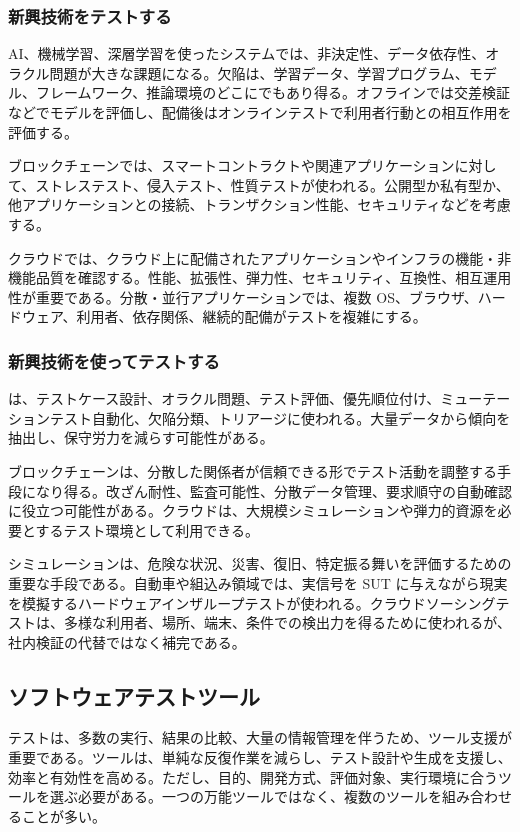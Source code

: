 \documentclass[a4paper,11pt]{ltjsarticle}
\numberwithin{figure}{section}
\numberwithin{table}{section}
\begin{document}
\subsubsection{新興技術をテストする}
AI、機械学習、深層学習を使ったシステムでは、非決定性、データ依存性、オラクル問題が大きな課題になる。欠陥は、学習データ、学習プログラム、モデル、フレームワーク、推論環境のどこにでもあり得る。オフラインでは交差検証などでモデルを評価し、配備後はオンラインテストで利用者行動との相互作用を評価する。

ブロックチェーンでは、スマートコントラクトや関連アプリケーションに対して、ストレステスト、侵入テスト、性質テストが使われる。公開型か私有型か、他アプリケーションとの接続、トランザクション性能、セキュリティなどを考慮する。

クラウドでは、クラウド上に配備されたアプリケーションやインフラの機能・非機能品質を確認する。性能、拡張性、弾力性、セキュリティ、互換性、相互運用性が重要である。分散・並行アプリケーションでは、複数 OS、ブラウザ、ハードウェア、利用者、依存関係、継続的配備がテストを複雑にする。

\subsubsection{新興技術を使ってテストする}
は、テストケース設計、オラクル問題、テスト評価、優先順位付け、ミューテーションテスト自動化、欠陥分類、トリアージに使われる。大量データから傾向を抽出し、保守労力を減らす可能性がある。

ブロックチェーンは、分散した関係者が信頼できる形でテスト活動を調整する手段になり得る。改ざん耐性、監査可能性、分散データ管理、要求順守の自動確認に役立つ可能性がある。クラウドは、大規模シミュレーションや弾力的資源を必要とするテスト環境として利用できる。

シミュレーションは、危険な状況、災害、復旧、特定振る舞いを評価するための重要な手段である。自動車や組込み領域では、実信号を SUT に与えながら現実を模擬するハードウェアインザループテストが使われる。クラウドソーシングテストは、多様な利用者、場所、端末、条件での検出力を得るために使われるが、社内検証の代替ではなく補完である。

\subsection{ソフトウェアテストツール}
テストは、多数の実行、結果の比較、大量の情報管理を伴うため、ツール支援が重要である。ツールは、単純な反復作業を減らし、テスト設計や生成を支援し、効率と有効性を高める。ただし、目的、開発方式、評価対象、実行環境に合うツールを選ぶ必要がある。一つの万能ツールではなく、複数のツールを組み合わせることが多い。
\end{document}
